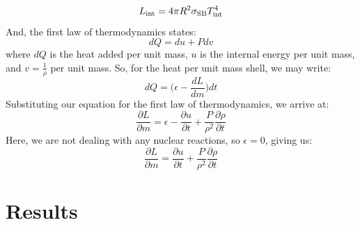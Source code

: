 \documentclass[11pt]{ucscthesisbs}
\begin{document}
\begin{equation}
L_{\rm int} = 4\pi R^2\sigma_{\rm SB}T_{\rm int}^4
\label{eq:intrinsic_luminosity}
\end{equation}
And, the first law of thermodynamics states:
\begin{equation}
dQ = du + Pdv
\label{eq:first_law_thermodynamics}
\end{equation}
where $dQ$ is the heat added per unit mass, $u$ is the internal energy per unit mass, and $v = \frac{1}{\rho}$ per unit mass.
So, for the heat per unit mass shell, we may write:
\begin{equation}
dQ = \big(\epsilon - \frac{dL}{dm})dt
\label{eq:heat_per_unit_mass_shell}
\end{equation}
Substituting our equation for the first law of thermodynamics, we arrive at:
\begin{equation}
\frac{\partial L}{\partial m} = \epsilon - \frac{\partial u}{\partial t} + \frac{P}{\rho^2}\frac{\partial \rho}{\partial t}
\end{equation}
Here, we are not dealing with any nuclear reactions, so $\epsilon = 0$, giving us:
\begin{equation}
\frac{\partial L}{\partial m} = \frac{\partial u}{\partial t} + \frac{P}{\rho^2}\frac{\partial \rho}{\partial t}
\end{equation}



\chapter{Results}
\end{document}
